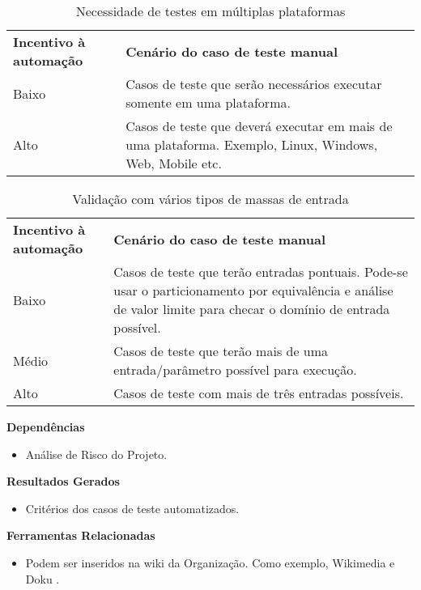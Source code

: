 \begin{table}[H]
\centering
\caption{Necessidade de testes em múltiplas plataformas}
\label{tab:3.11}
\begin{tabular}{|p{50mm}|p{80mm}|}
\cline{1-2}
\textbf{Incentivo à automação} & \textbf{Cenário do caso de teste manual}\\
    \cline{1-2}
    Baixo & Casos de teste que serão necessários executar somente em uma plataforma.\\
    \cline{1-2}
    Alto & Casos de teste que deverá executar em mais de uma plataforma. Exemplo, Linux, Windows, Web, Mobile etc.\\
    \cline{1-2}
\end{tabular}
\end{table}

\begin{table}[H]
\centering
\caption{Validação com vários tipos de massas de entrada}
\label{tab:3.12}
\begin{tabular}{|p{50mm}|p{80mm}|}
\cline{1-2}
\textbf{Incentivo à automação} & \textbf{Cenário do caso de teste manual}\\
    \cline{1-2}
    Baixo & Casos de teste que terão entradas pontuais. Pode-se usar o particionamento por equivalência e análise de valor limite para checar o domínio de entrada possível.\\ \cline{1-2} 
    Médio & Casos de teste que terão mais de uma entrada/parâmetro possível para execução.\\ \cline{1-2}
    Alto & Casos de teste com mais de três entradas possíveis.\\
    \cline{1-2}
\end{tabular}
\end{table}

\textbf{ Dependências }
\begin{itemize}
    \item Análise de Risco do Projeto.
\end{itemize}

\textbf{ Resultados Gerados }
\begin{itemize}
    \item Critérios dos casos de teste automatizados.
\end{itemize}

\textbf{ Ferramentas Relacionadas }
\begin{itemize}
    \item Podem ser inseridos na wiki da Organização. Como exemplo, Wikimedia \cite{Wikimedia} e  Doku \cite{Doku}.
\end{itemize}

